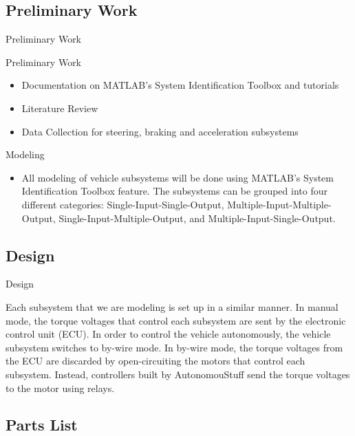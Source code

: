 \documentclass{beamer}
\begin{document}
\subsection{Preliminary Work}

\begin{frame}{Preliminary Work}
  \begin{block}{Preliminary Work}
 \begin{itemize}
        \item Documentation on MATLAB's System Identification Toolbox and tutorials
        \item Literature Review 
        \item Data Collection for steering, braking and acceleration subsystems
\end{itemize}
  \end{block}
  \begin {block}{Modeling}
  \begin{itemize}
  	\item All modeling of vehicle subsystems will be done using MATLAB's System Identification Toolbox feature. The subsystems can be grouped into four different categories: Single-Input-Single-Output, Multiple-Input-Multiple-Output, Single-Input-Multiple-Output, and Multiple-Input-Single-Output. 
  	\end{itemize}
  	\end{block}
\end{frame}

\subsection{Design}

\begin{frame}{Design}
	\begin{block}{}
		Each subsystem that we are modeling is set up in a similar manner. In manual mode, the torque voltages that control each subsystem are sent by the electronic control unit (ECU). In order to control the vehicle autonomously, the vehicle subsystem switches to by-wire mode. In by-wire mode, the torque voltages from the ECU are discarded by open-circuiting the motors that control each subsystem. Instead, controllers built by AutonomouStuff send the torque voltages to the motor using relays.
	\end{block}
\end{frame}

\subsection{Parts List}
\end{document}
